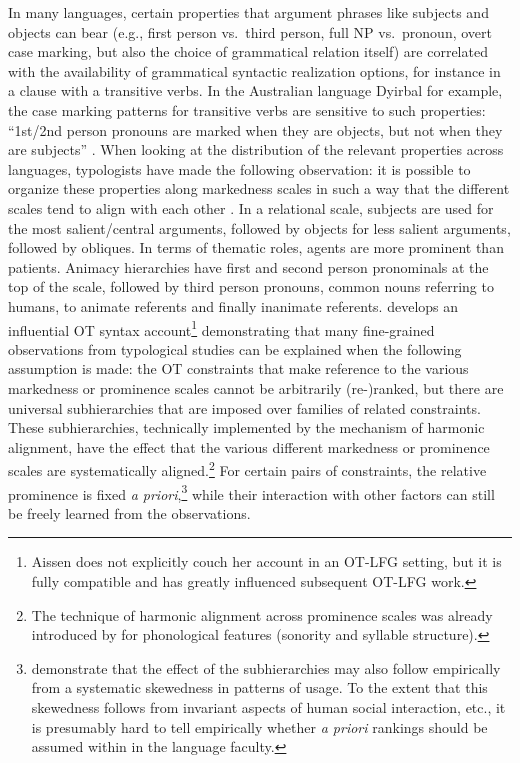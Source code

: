 \documentclass[output=paper,hidelinks]{langscibook}
\begin{document}
In many languages, certain properties that argument phrases like subjects and objects can bear (e.g., first person vs.\ third person, full NP vs.\ pronoun, overt case marking, but also the choice of grammatical relation itself) are correlated with the availability of grammatical syntactic realization options, for instance in a clause with a transitive verbs. 
In the Australian language Dyirbal for example, the case marking patterns for transitive verbs are sensitive to such properties: ``1st/2nd person pronouns are marked when they are objects, but not when they are subjects'' \citep[][674]{Aissen1999}.
When looking at the distribution of the relevant properties across languages, typologists have made the following observation: it is possible to organize these properties along markedness scales in such a way that the different scales tend to align with each other \citep{Silverstein}. In a relational scale, subjects are used for the most salient/central arguments, followed by objects for less salient arguments, followed by obliques. In terms of thematic roles, agents are more prominent than patients. Animacy hierarchies have first and second person pronominals at the top of the scale, followed by third person pronouns, common nouns referring to humans, to animate referents and finally inanimate referents. \citet{Aissen1999,Aissen2003} develops an influential OT syntax account\footnote{Aissen does not explicitly couch her account in an OT-LFG setting, but it is fully compatible and has greatly influenced subsequent OT-LFG work.} demonstrating that many fine-grained observations from typological studies can be explained when the following assumption is made: 
the OT constraints that make reference to the various markedness or prominence scales cannot be arbitrarily (re-)ranked, but there are universal subhierarchies that are imposed over families of related constraints. These subhierarchies, technically implemented by the mechanism of harmonic alignment, have the effect that the various different markedness or prominence scales are systematically aligned.\footnote{The technique of harmonic alignment across prominence scales was already introduced by \citet{PrinceSmolensky1993} for phonological features (sonority and syllable structure).} For certain pairs of constraints, the relative prominence is fixed \emph{a priori},\footnote{\citet{zeevat2002reinterpretation} demonstrate that the effect of the subhierarchies may also follow empirically from a systematic skewedness in patterns of usage. To the extent that this skewedness follows from invariant aspects of human social interaction, etc., it is presumably hard to tell empirically whether \emph{a priori} rankings should be assumed within in the language faculty.} while their interaction with other factors can still be freely learned from the observations.
\end{document}
